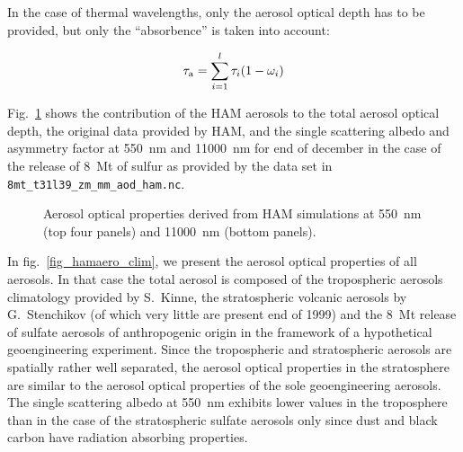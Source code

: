 \begin{appendix}
In the case of thermal wavelengths, only the aerosol optical depth has
to be provided, but only the ``absorbence'' is taken into account:

\begin{equation}\label{eqm4}
\tau_{\rm a}=\sum\limits_{i=1}^l \tau_i(1-\omega_i)
\end{equation}

Fig.~\ref{fig_hamaero} shows the contribution of the HAM aerosols to
the total aerosol optical depth, the original data provided by HAM, and
the single scattering albedo and asymmetry factor at 550~nm and
11000~nm for end of 
december in the case of the release of 8~Mt of sulfur as provided by
the data set in
{\tt8mt\_t31l39\_zm\_mm\_aod\_ham.nc}. 

\begin{figure}[htb]
\vspace{-3.5cm}
\pctsix
{\vspace{-2.7cm}\hspace{-1cm}}
{\vspace{-2.7cm}}
{\vspace{-2.7cm}\hspace{-1cm}}
{\vspace{-2.7cm}}
{\vspace{-0.7cm}\hspace{-1cm}}
{\vspace{-0.7cm}}
\caption{Aerosol optical properties derived from HAM simulations at
  550~nm (top four panels) and 11000~nm (bottom panels).}\label{fig_hamaero}
\end{figure}

In fig.~\ref{fig_hamaero_clim}, we present the aerosol optical
properties of all aerosols. In that case the total aerosol is composed
of the tropospheric aerosols climatology provided by S.~Kinne, the
stratospheric volcanic aerosols by G.~Stenchikov (of which very little
are present end of 1999) and the 8~Mt release of sulfate aerosols of
anthropogenic origin in the framework of a hypothetical geoengineering
experiment. Since the tropospheric and stratospheric aerosols are
spatially rather well separated, 
the aerosol optical properties in the stratosphere are similar to the
aerosol optical properties of the sole geoengineering aerosols.
The single scattering albedo at 550~nm exhibits lower values in the
troposphere than in
the case of the stratospheric sulfate aerosols only since dust and
black carbon have radiation absorbing properties.



\end{appendix}
